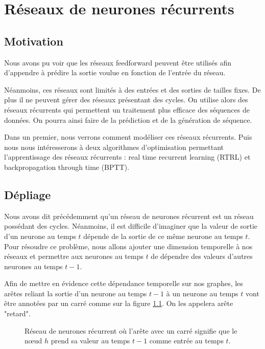 \chapter{Réseaux de neurones récurrents}
\label{chap:Réseaux de neurones récurrents}
\section{Motivation}

Nous avons pu voir que les réseaux feedforward peuvent être utilisés afin d'appendre à prédire la sortie voulue en fonction de l'entrée du réseau. 

Néanmoins, ces réseaux sont limités à des entrées et des sorties de tailles fixes. De plus il ne peuvent gérer des réseaux présentant des cycles. On utilise alors des réseaux récurrents qui permettent un traitement plus efficace des séquences de données. On pourra ainsi faire de la prédiction et de la génération de séquence.

Dans un premier, nous verrons comment modéliser ces réseaux récurrents. Puis nous nous intéresserons à deux algorithmes d'optimisation permettant l'apprentissage des réseaux récurrents : real time recurrent learning (RTRL) et backpropagation through time (BPTT).

\section{Dépliage}

Nous avons dit précédemment qu'un réseau de neurones récurrent est un réseau possédant des cycles. Néanmoins, il est difficile d'imaginer que la valeur de sortie d'un neurone au temps $t$ dépende de la sortie de ce même neurone au temps $t$. Pour résoudre ce problème, nous allons ajouter une dimension temporelle à nos réseaux et permettre aux neurones au temps $t$ de dépendre des valeurs d'autres neurones au temps $t-1$.

Afin de mettre en évidence cette dépendance temporelle sur nos graphes, les arêtes reliant la sortie d'un neurone au temps $t-1$ à un neurone au temps $t$ vont être annotées par un carré comme sur la figure \ref{arete_retard}. On les appelera arête "retard".

\begin{figure}
\begin{center}

\caption{Réseau de neurones récurrent où l'arête avec un carré signifie que le n\oe{}ud $h$ prend sa valeur au temps $t-1$ comme entrée au temps $t$.}
\label{arete_retard}
\end{center}
\end{figure}

